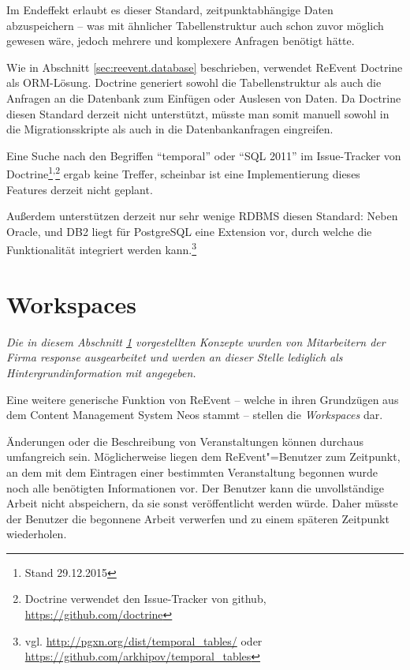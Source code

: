 Im Endeffekt erlaubt es dieser Standard, zeitpunktabhängige Daten abzuspeichern -- was mit ähnlicher Tabellenstruktur auch schon zuvor möglich gewesen wäre, jedoch mehrere und komplexere Anfragen benötigt hätte.

Wie in Abschnitt \ref{sec:reevent.database} beschrieben, verwendet ReEvent Doctrine als ORM-Lösung. Doctrine generiert sowohl die Tabellenstruktur als auch die Anfragen an die Datenbank zum Einfügen oder Auslesen von Daten. Da Doctrine diesen Standard derzeit nicht unterstützt, müsste man somit manuell sowohl in die Migrationsskripte als auch in die Datenbankanfragen eingreifen.

Eine Suche nach den Begriffen \enquote{temporal} oder \enquote{SQL 2011} im Issue-Tracker von Doctrine\footnote{Stand 29.12.2015}\textsuperscript{,}\footnote{Doctrine verwendet den Issue-Tracker von github, \url{https://github.com/doctrine}} ergab keine Treffer, scheinbar ist eine Implementierung dieses Features derzeit nicht geplant.

Außerdem unterstützen derzeit nur sehr wenige RDBMS diesen Standard: Neben Oracle, und DB2 liegt für PostgreSQL eine Extension vor, durch welche die Funktionalität integriert werden kann.\footnote{vgl. \url{http://pgxn.org/dist/temporal_tables/} oder \url{https://github.com/arkhipov/temporal_tables}}

\section{Workspaces}
\label{sec:workspaces}

\begin{center}
\parbox{0.9\textwidth}{
\itshape
\small
Die in diesem Abschnitt \ref{sec:workspaces} vorgestellten Konzepte wurden von Mitarbeitern der Firma response ausgearbeitet und werden an dieser Stelle lediglich als Hintergrundinformation mit angegeben.
}
\end{center}

Eine weitere generische Funktion von ReEvent -- welche in ihren Grundzügen aus dem Content Management System Neos stammt -- stellen die \emph{Workspaces} dar.

Änderungen oder die Beschreibung von Veranstaltungen können durchaus umfangreich sein. Möglicherweise liegen dem ReEvent"=Benutzer zum Zeitpunkt, an dem mit dem Eintragen einer bestimmten Veranstaltung begonnen wurde noch alle benötigten Informationen vor. Der Benutzer kann die unvollständige Arbeit nicht abspeichern, da sie sonst veröffentlicht werden würde. Daher müsste der Benutzer die begonnene Arbeit verwerfen und zu einem späteren Zeitpunkt wiederholen.

